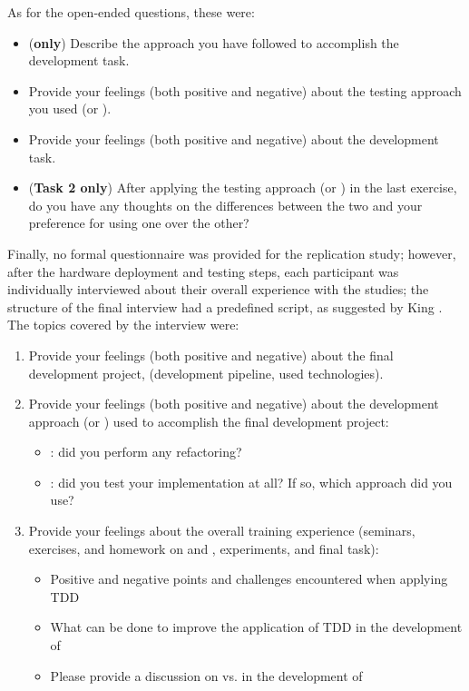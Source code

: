 \noindent As for the open-ended questions, these were:
\begin{itemize}
    \item (\textbf{\notdd only}) Describe the \notdd approach you have followed to accomplish the development task.
    \item Provide your feelings (both positive and negative) about the testing approach you used (\ie \tdd or \notdd).
    \item Provide your feelings (both positive and negative) about the development task.
    \item (\textbf{Task 2 only}) After applying the testing approach (\ie \tdd or \notdd) in the last exercise, do you have any thoughts on the differences between the two and your preference for using one over the other?
\end{itemize}

\noindent Finally, no formal questionnaire was provided for the replication study; however, after the hardware deployment and testing steps, each participant was individually interviewed about their overall experience with the studies; the structure of the final interview had a predefined script, as suggested by King \cite{King:2004}. The topics covered by the interview were:
\begin{enumerate}
    \item Provide your feelings (both positive and negative) about the final development project, (\eg development pipeline, used technologies).
    \item Provide your feelings (both positive and negative) about the development approach (\ie \tdd or \notdd) used to accomplish the final development project:
        \begin{itemize}
            \item \tdd: did you perform any refactoring? 
            \item \notdd: did you test your implementation at all? If so, which approach did you use?
        \end{itemize}
    \item Provide your feelings about the overall training experience (seminars, exercises, and homework on \tdd and \notdd, experiments, and final task):
        \begin{itemize}
            \item Positive and negative points and challenges encountered when applying TDD
            \item What can be done to improve the application of TDD in the development of \ess
            \item Please provide a discussion on \tdd vs. \notdd in the development of \ess
        \end{itemize}
\end{enumerate}

